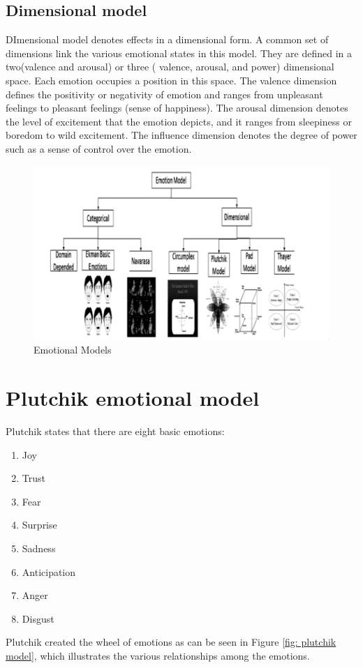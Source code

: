  
 
\subsection{Dimensional model}
DImensional model denotes effects in a dimensional form. A common set of dimensions link the various emotional states in this model. They are defined in a
two(valence and arousal) or three ( valence, arousal, and power) dimensional space. Each emotion occupies a position in this space. The valence dimension defines the positivity or negativity of emotion and ranges from unpleasant feelings to pleasant feelings (sense of happiness). The arousal dimension denotes the level of excitement that the emotion depicts, and it ranges from sleepiness or boredom to wild excitement. The influence dimension denotes the degree of power such as a sense of control over the emotion.

\begin{figure}[H]
\centering
\includegraphics[width=\textwidth]{imgs/emotion_models.png}
\caption{Emotional Models}
\label{fig: emotional models}
\end{figure}

\section{Plutchik emotional model}
Plutchik \cite{plutchik_emotions} states that there are eight basic emotions: 
\begin{enumerate}
	\item Joy
	\item Trust
	\item Fear
	\item Surprise
	\item Sadness
	\item Anticipation
	\item Anger
	\item Disgust
\end{enumerate}
Plutchik created the wheel of emotions as can be seen in Figure \ref{fig: plutchik model}, which illustrates the various relationships among the emotions. \newline

